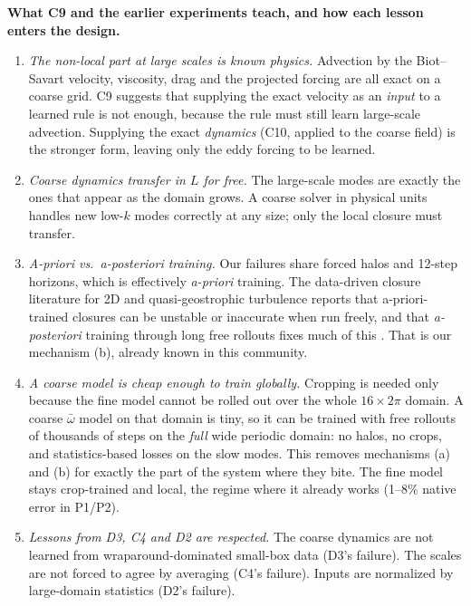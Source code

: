\documentclass[11pt]{article}
\begin{document}
\textbf{What C9 and the earlier experiments teach, and how each lesson
enters the design.}
\begin{enumerate}[leftmargin=*]
\item \emph{The non-local part at large scales is known physics.}
  Advection by the Biot--Savart velocity, viscosity, drag and the
  projected forcing are all exact on a coarse grid. C9 suggests that
  supplying the exact velocity as an \emph{input} to a learned rule is
  not enough, because the rule must still learn large-scale advection.
  Supplying the exact \emph{dynamics} (C10, applied to the coarse field)
  is the stronger form, leaving only the eddy forcing to be learned.
\item \emph{Coarse dynamics transfer in $L$ for free.} The large-scale
  modes are exactly the ones that appear as the domain grows. A coarse
  solver in physical units handles new low-$k$ modes correctly at any
  size; only the local closure must transfer.
\item \emph{A-priori vs.\ a-posteriori training.} Our failures share
  forced halos and 12-step horizons, which is effectively \emph{a-priori}
  training. The data-driven closure literature for 2D and
  quasi-geostrophic turbulence reports that a-priori-trained closures can
  be unstable or inaccurate when run freely, and that \emph{a-posteriori}
  training through long free rollouts fixes much of this
  \cite{guan2022,frezat2022}. That is our mechanism (b), already known in
  this community.
\item \emph{A coarse model is cheap enough to train globally.} Cropping
  is needed only because the fine model cannot be rolled out over the
  whole $16\times2\pi$ domain. A coarse $\bar\omega$ model on that domain
  is tiny, so it can be trained with free rollouts of thousands of steps
  on the \emph{full} wide periodic domain: no halos, no crops, and
  statistics-based losses on the slow modes. This removes mechanisms (a)
  and (b) for exactly the part of the system where they bite. The fine
  model stays crop-trained and local, the regime where it already works
  (1--8\% native error in P1/P2).
\item \emph{Lessons from D3, C4 and D2 are respected.} The coarse
  dynamics are not learned from wraparound-dominated small-box data
  (D3's failure). The scales are not forced to agree by averaging (C4's
  failure). Inputs are normalized by large-domain statistics (D2's
  failure).
\end{enumerate}
\end{document}
